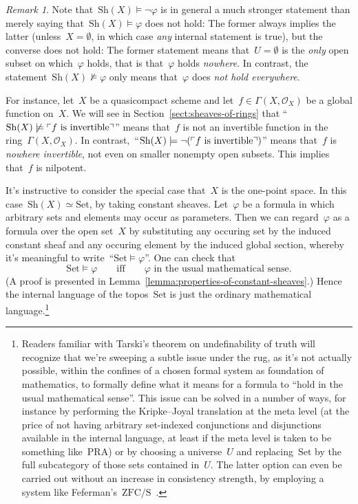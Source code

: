 \documentclass[10pt,reqno,a4paper]{amsbook}
\theoremstyle{definition}
\theoremstyle{plain}
\theoremstyle{remark}
\newtheorem{rem}[defn]{Remark}
\renewcommand{\O}{\mathcal{O}}
\newcommand{\Set}{\mathrm{Set}}
\newcommand{\Sh}{\mathrm{Sh}}
\newcommand{\?}{\,{:}\,}
\renewcommand{\_}{\mathpunct{.}\,}
\newcommand{\speak}[1]{\ulcorner\text{\textnormal{#1}}\urcorner}
\begin{document}
\begin{rem}Note that~$\Sh(X) \models \neg\varphi$ is in general a much stronger
statement than merely saying that~$\Sh(X) \models \varphi$ does not hold:
The former always implies the latter (unless~$X = \emptyset$, in which case
\emph{any} internal statement is true), but the converse does not hold: The
former statement means that~$U = \emptyset$ is the \emph{only} open subset on
which~$\varphi$ holds, that is that~$\varphi$ holds \emph{nowhere}. In
contrast, the statement~$\Sh(X) \not\models \varphi$ only means that~$\varphi$
does \emph{not hold everywhere}.

For instance, let~$X$ be a quasicompact scheme and let~$f \in
\Gamma(X,\O_X)$ be a global function on~$X$. We will see in
Section~\ref{sect:sheaves-of-rings} that ``$\Sh(X) \not\models \speak{$f$ is
invertible}$'' means that~$f$ is not an invertible function in the
ring~$\Gamma(X,\O_X)$. In contrast,~``$\Sh(X) \models \neg(\speak{$f$ is
invertible})$'' means that~$f$ is \emph{nowhere invertible}, not even on
smaller non\-empty open subsets. This implies that~$f$ is nilpotent.
\end{rem}

It's instructive to consider the special case that~$X$ is the one-point space.
In this case~$\Sh(X) \simeq \Set$, by taking constant sheaves.
Let~$\varphi$ be a formula in which arbitrary sets and elements may occur as
parameters. Then we can regard~$\varphi$ as a formula over the open set~$X$ by
substituting any occuring set by the induced constant sheaf and any occuring
element by the induced global section, whereby it's meaningful to
write~``$\Set \models \varphi$''. One can check that
\[ \Set \models \varphi \qquad\text{iff}\qquad \text{$\varphi$ in the usual
mathematical sense}. \]
(A proof is presented in Lemma~\ref{lemma:properties-of-constant-sheaves}.)
Hence the internal language of the topos~$\Set$ is just the ordinary
mathematical language.\footnote{Readers familiar with Tarski's theorem on
undefinability of truth will recognize that we're sweeping a subtle issue under
the rug, as it's not actually possible, within the confines of a chosen formal
system as foundation of mathematics, to formally define what it means for a
formula to ``hold in the usual mathematical sense''. This issue can be solved
in a number of ways, for instance by performing the Kripke--Joyal translation
at the meta level (at the price of not having arbitrary set-indexed
conjunctions and disjunctions available in the internal language, at least if
the meta level is taken to be something like~$\mathrm{PRA}$) or by choosing a
universe~$U$ and replacing~$\Set$ by the full subcategory of those sets
contained in~$U$. The latter option can even be carried out without an increase
in consistency strength, by employing a system
like Feferman's~$\mathrm{ZFC}/\mathrm{S}$~\cite{shulman:set-theory,feferman:set-foundations}.}
\end{document}
